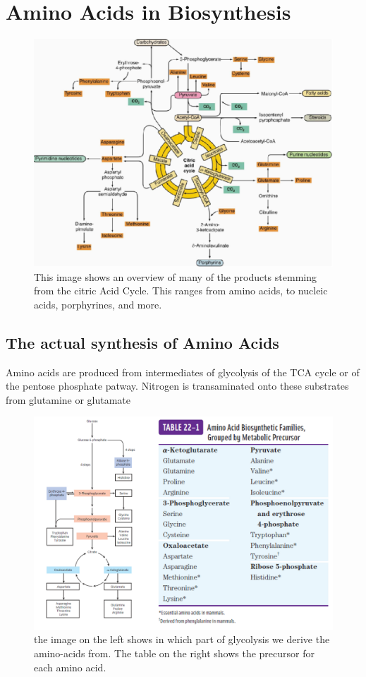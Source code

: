 \documentclass[../main.tex]{subfiles}
\begin{document}
	
\section{Amino Acids in Biosynthesis}

\begin{figure}[H]
	\centering
	\includegraphics[width=0.7\linewidth]{Overview}
	\caption{This image shows an overview of many of the products stemming from the citric Acid Cycle. This ranges from amino acids, to nucleic acids, porphyrines, and more.}
	\label{fig:overview}
\end{figure}


\subsection{The actual synthesis of Amino Acids}

Amino acids are produced from intermediates of glycolysis of the TCA cycle or of the pentose phosphate patway. Nitrogen is transaminated onto these substrates from glutamine or glutamate

\begin{figure}[H]
	\centering
	\includegraphics[width=0.8\linewidth]{amino_overview}
	\caption{the image on the left shows in which part of glycolysis we derive the amino-acids from. The table on the right shows the precursor for each amino acid.}
	\label{fig:aminooverview}
\end{figure}
\end{document}
